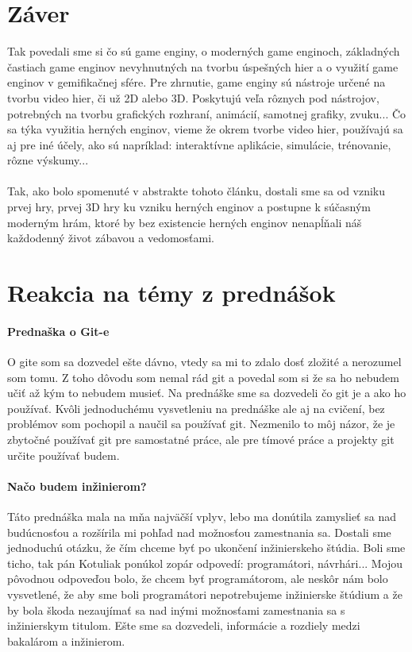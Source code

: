 \documentclass[10pt,oneside,slovak,a4paper,hidelinks]{article}
\begin{document}
	\section{Záver}
		Tak povedali sme si čo sú game enginy, o moderných game enginoch, základných častiach game enginov nevyhnutných na tvorbu úspešných hier a o využití game enginov v gemifikačnej sfére. Pre zhrnutie, game enginy sú nástroje určené na tvorbu video hier, či už 2D alebo 3D. Poskytujú veľa rôznych pod nástrojov, potrebných na tvorbu grafických rozhraní, animácií, samotnej grafiky, zvuku... Čo sa týka využitia herných enginov, vieme že okrem tvorbe video hier, používajú sa aj pre iné účely, ako sú napríklad: interaktívne aplikácie, simulácie, trénovanie, rôzne výskumy...
		\paragraph{}Tak, ako bolo spomenuté v abstrakte tohoto článku, dostali sme sa od vzniku prvej hry\cite{FirstGame}, prvej 3D hry\cite{First3DGame} ku vzniku herných enginov a postupne k súčasným moderným hrám, ktoré by bez existencie herných enginov nenapĺňali náš každodenný život zábavou a vedomosťami.
	\section{Reakcia na témy z prednášok}
		\paragraph{Prednaška o Git-e}
			O gite som sa dozvedel ešte dávno, vtedy sa mi to zdalo dosť zložité a nerozumel som tomu. Z toho dôvodu som nemal rád git a povedal som si že sa ho nebudem učiť až kým to nebudem musieť. Na prednáške sme sa dozvedeli čo git je a ako ho používať. Kvôli jednoduchému vysvetleniu na prednáške ale aj na cvičení, bez problémov som pochopil a naučil sa používať git. Nezmenilo to môj názor, že je zbytočné používať git pre samostatné práce, ale pre tímové práce a projekty git určite používať budem.
		\paragraph{Načo budem inžinierom?}
			Táto prednáška mala na mňa najväčší vplyv, lebo ma donútila zamyslieť sa nad budúcnosťou a rozšírila mi pohľad nad možnosťou zamestnania sa. Dostali sme jednoduchú otázku, že čím chceme byť po ukončení inžinierskeho štúdia. Boli sme ticho, tak pán Kotuliak ponúkol zopár odpovedí: programátori, návrhári... Mojou pôvodnou odpoveďou bolo, že chcem byť programátorom, ale neskôr nám bolo vysvetlené, že aby sme boli programátori nepotrebujeme inžinierske štúdium a že by bola škoda nezaujímať sa nad inými možnosťami zamestnania sa s inžinierskym titulom. Ešte sme sa dozvedeli, informácie a rozdiely medzi bakalárom a inžinierom.
\end{document}
